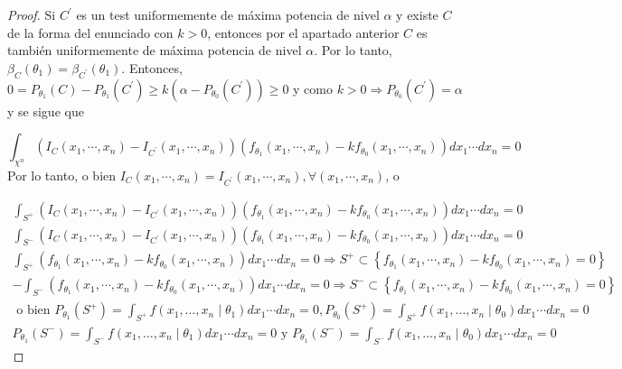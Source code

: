 \begin{proof}
Si $C^{\prime}$ es un test uniformemente de máxima potencia de nivel $\alpha$ y existe $C$ de la forma del enunciado con $k>0$, entonces por el apartado anterior $C$ es también uniformemente de máxima potencia de nivel $\alpha$. Por lo tanto, $\beta_{C}\left(\theta_{1}\right)=\beta_{C^{\prime}}\left(\theta_{1}\right)$. Entonces, $0=P_{\theta_{1}}(C)-P_{\theta_{1}}\left(C^{\prime}\right) \geq k\left(\alpha-P_{\theta_{0}}\left(C^{\prime}\right)\right) \geq 0$ y como $k>0 \Rightarrow P_{\theta_{0}}\left(C^{\prime}\right)=\alpha$ y se sigue que

$$
\int_{\chi^{n}}\left(I_{C}\left(x_{1}, \cdots, x_{n}\right)-I_{C^{\prime}}\left(x_{1}, \cdots, x_{n}\right)\right)\left(f_{\theta_{1}}\left(x_{1}, \cdots, x_{n}\right)-k f_{\theta_{0}}\left(x_{1}, \cdots, x_{n}\right)\right) d x_{1} \cdots d x_{n}=0
$$
Por lo tanto, o bien $I_{C}\left(x_{1}, \cdots, x_{n}\right)=I_{C^{\prime}}\left(x_{1}, \cdots, x_{n}\right), \forall\left(x_{1}, \cdots, x_{n}\right)$, o

$$
\begin{gathered}
\int_{S^{+}}\left(I_{C}\left(x_{1}, \cdots, x_{n}\right)-I_{C^{\prime}}\left(x_{1}, \cdots, x_{n}\right)\right)\left(f_{\theta_{1}}\left(x_{1}, \cdots, x_{n}\right)-k f_{\theta_{0}}\left(x_{1}, \cdots, x_{n}\right)\right) d x_{1} \cdots d x_{n}=0 \\
\int_{S^{-}}\left(I_{C}\left(x_{1}, \cdots, x_{n}\right)-I_{C^{\prime}}\left(x_{1}, \cdots, x_{n}\right)\right)\left(f_{\theta_{1}}\left(x_{1}, \cdots, x_{n}\right)-k f_{\theta_{0}}\left(x_{1}, \cdots, x_{n}\right)\right) d x_{1} \cdots d x_{n}=0 \\
\int_{S^{+}}\left(f_{\theta_{1}}\left(x_{1}, \cdots, x_{n}\right)-k f_{\theta_{0}}\left(x_{1}, \cdots, x_{n}\right)\right) d x_{1} \cdots d x_{n}=0 \Rightarrow S^{+} \subset\left\{f_{\theta_{1}}\left(x_{1}, \cdots, x_{n}\right)-k f_{\theta_{0}}\left(x_{1}, \cdots, x_{n}\right)=0\right\} \\
-\int_{S^{-}}\left(f_{\theta_{1}}\left(x_{1}, \cdots, x_{n}\right)-k f_{\theta_{0}}\left(x_{1}, \cdots, x_{n}\right)\right) d x_{1} \cdots d x_{n}=0 \Rightarrow S^{-} \subset\left\{f_{\theta_{1}}\left(x_{1}, \cdots, x_{n}\right)-k f_{\theta_{0}}\left(x_{1}, \cdots, x_{n}\right)=0\right\} \\
\text { o bien } P_{\theta_{1}}\left(S^{+}\right)=\int_{S^{+}} f\left(x_{1}, \ldots, x_{n} \mid \theta_{1}\right) d x_{1} \cdots d x_{n}=0, P_{\theta_{0}}\left(S^{+}\right)=\int_{S^{+}} f\left(x_{1}, \ldots, x_{n} \mid \theta_{0}\right) d x_{1} \cdots d x_{n}=0 \\
P_{\theta_{1}}\left(S^{-}\right)=\int_{S^{-}} f\left(x_{1}, \ldots, x_{n} \mid \theta_{1}\right) d x_{1} \cdots d x_{n}=0 \text { y } P_{\theta_{1}}\left(S^{-}\right)=\int_{S^{-}} f\left(x_{1}, \ldots, x_{n} \mid \theta_{0}\right) d x_{1} \cdots d x_{n}=0
\end{gathered}
$$
\end{proof}

